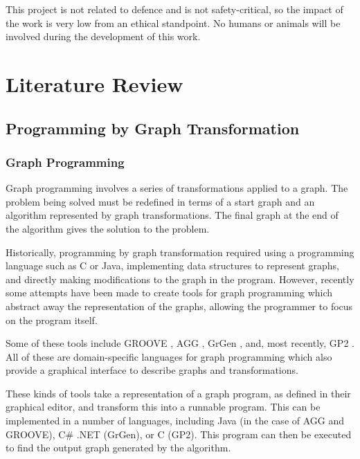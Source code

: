 \documentclass[authoryearcitations]{UoYCSproject}
\begin{document}
This project is not related to defence and is not safety-critical, so the impact
of the work is very low from an ethical standpoint. No humans or animals will be
involved during the development of this work.

\clearpage


\chapter{Literature Review}
\label{cha:LiteratureReview}

\section{Programming by Graph Transformation}
\label{sec:ProgrammingByGraphTransformation}

\subsection{Graph Programming}
\label{sec:GraphProgramming}

Graph programming involves a series of transformations applied to a graph. The
problem being solved must be redefined in terms of a start graph and an algorithm
represented by graph transformations. The final graph at the end of the algorithm
gives the solution to the problem.

Historically, programming by graph transformation required using a programming
language such as C or Java, implementing data structures to represent graphs, and
directly making modifications to the graph in the program. However, recently some
attempts have been made to create tools for graph programming which abstract away
the representation of the graphs, allowing the programmer to focus on the program itself.

Some of these tools include GROOVE \citep{GROOVE2012}, AGG \citep{ermel1999},
GrGen \citep{GrGen2010}, and, most recently, GP2 \citep{plump2012}. All of these
are domain-specific languages for graph programming which also provide a graphical
interface to describe graphs and transformations.

These kinds of tools take a representation of a graph program, as defined in their
graphical editor, and transform this into a runnable program. This can be implemented
in a number of languages, including Java (in the case of AGG and GROOVE), C\# .NET
(GrGen), or C (GP2). This program can then be executed to find the output graph
generated by the algorithm.
\end{document}
